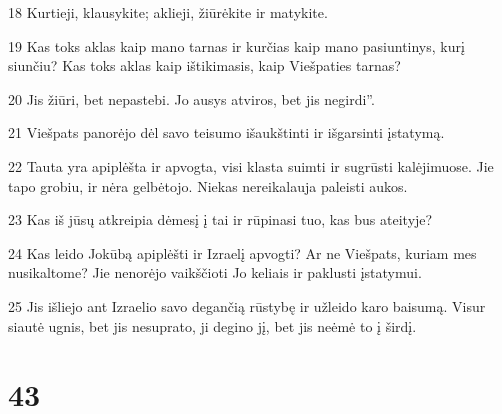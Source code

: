 \par 18 Kurtieji, klausykite; aklieji, žiūrėkite ir matykite. 
\par 19 Kas toks aklas kaip mano tarnas ir kurčias kaip mano pasiuntinys, kurį siunčiu? Kas toks aklas kaip ištikimasis, kaip Viešpaties tarnas? 
\par 20 Jis žiūri, bet nepastebi. Jo ausys atviros, bet jis negirdi”. 
\par 21 Viešpats panorėjo dėl savo teisumo išaukštinti ir išgarsinti įstatymą. 
\par 22 Tauta yra apiplėšta ir apvogta, visi klasta suimti ir sugrūsti kalėjimuose. Jie tapo grobiu, ir nėra gelbėtojo. Niekas nereikalauja paleisti aukos. 
\par 23 Kas iš jūsų atkreipia dėmesį į tai ir rūpinasi tuo, kas bus ateityje? 
\par 24 Kas leido Jokūbą apiplėšti ir Izraelį apvogti? Ar ne Viešpats, kuriam mes nusikaltome? Jie nenorėjo vaikščioti Jo keliais ir paklusti įstatymui. 
\par 25 Jis išliejo ant Izraelio savo degančią rūstybę ir užleido karo baisumą. Visur siautė ugnis, bet jis nesuprato, ji degino jį, bet jis neėmė to į širdį.



\chapter{43}


